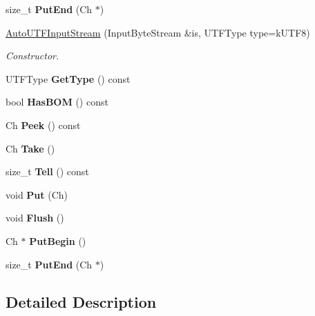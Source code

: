 \begin{DoxyCompactItemize}
size\+\_\+t {\bfseries Put\+End} (Ch $\ast$)
\item 
\hyperlink{classAutoUTFInputStream_a83837fced0971ba26dd9a8ec1575abb0}{Auto\+U\+T\+F\+Input\+Stream} (Input\+Byte\+Stream \&is, U\+T\+F\+Type type=k\+U\+T\+F8)
\begin{DoxyCompactList}\small\item\em Constructor. \end{DoxyCompactList}\item 
\mbox{\label{classAutoUTFInputStream_ad8e8b71e852db11a841fbba40431c5d1}} 
U\+T\+F\+Type {\bfseries Get\+Type} () const
\item 
\mbox{\label{classAutoUTFInputStream_a8831def623c28a3ec1d59b75abe5b20e}} 
bool {\bfseries Has\+B\+OM} () const
\item 
\mbox{\label{classAutoUTFInputStream_a616fbe24878a2026fbc7743acb50438c}} 
Ch {\bfseries Peek} () const
\item 
\mbox{\label{classAutoUTFInputStream_a652cd1ae8bd848a5ecce4efa1ebd0f38}} 
Ch {\bfseries Take} ()
\item 
\mbox{\label{classAutoUTFInputStream_a6b847c75309e4ed36957f232b9ce88d1}} 
size\+\_\+t {\bfseries Tell} () const
\item 
\mbox{\label{classAutoUTFInputStream_a5ea730d1ab715f58ce4f9e3dcd77810a}} 
void {\bfseries Put} (Ch)
\item 
\mbox{\label{classAutoUTFInputStream_aecc08f52794d761fc1b729907a83dcf8}} 
void {\bfseries Flush} ()
\item 
\mbox{\label{classAutoUTFInputStream_a761841842c147c0bb1a69bfacbc117a2}} 
Ch $\ast$ {\bfseries Put\+Begin} ()
\item 
\mbox{\label{classAutoUTFInputStream_a41bd66602f82d344383792feac34f9f7}} 
size\+\_\+t {\bfseries Put\+End} (Ch $\ast$)
\end{DoxyCompactItemize}


\subsection{Detailed Description}

